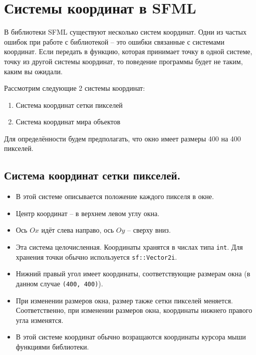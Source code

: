 \documentclass{article}
\begin{document}
\section{Системы координат в SFML}
В библиотеки SFML существуют несколько систем координат. Одни из частых ошибок при работе с библиотекой -- это ошибки связанные с системами координат. Если передать в функцию, которая принимает точку в одной системе, точку из другой системы координат, то поведение программы будет не таким, каким вы ожидали.

Рассмотрим следующие 2 системы координат:
\begin{enumerate}
\item Система координат сетки пикселей
\item Система координат мира объектов
\end{enumerate}
Для определённости будем предполагать, что окно имеет размеры 400 на 400 пикселей.

\subsection*{Система координат сетки пикселей.}
\begin{itemize}
\item В этой системе описывается положение каждого пикселя в окне.
\item Центр координат -- в верхнем левом углу окна. 
\item Ось $Ox$ идёт слева направо, ось $Oy$ -- сверху вниз.
\item Эта система целочисленная. Координаты хранятся в числах типа \texttt{int}. Для хранения точки обычно используется \texttt{sf::Vector2i}.
\item Нижний правый угол имеет координаты, соответствующие размерам окна (в данном случае \texttt{(400, 400)}).
\item При изменении размеров окна, размер также сетки пикселей меняется. Соответственно, при изменении размеров окна, координаты нижнего правого угла изменятся.
\item В этой системе координат обычно возращаются координаты курсора мыши функциями библиотеки.
\end{itemize}
\end{document}
